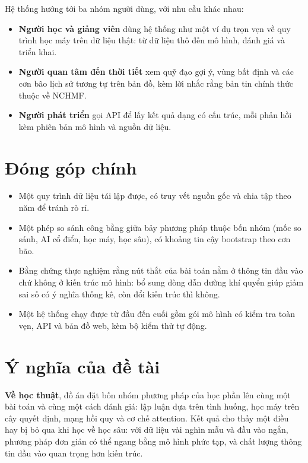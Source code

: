 Hệ thống hướng tới ba nhóm người dùng, với nhu cầu khác nhau:
\begin{itemize}[leftmargin=1.6em, itemsep=2pt]
  \item \textbf{Người học và giảng viên} dùng hệ thống như một ví dụ trọn vẹn
        về quy trình học máy trên dữ liệu thật: từ dữ liệu thô đến mô hình,
        đánh giá và triển khai.
  \item \textbf{Người quan tâm đến thời tiết} xem quỹ đạo gợi ý, vùng bất định
        và các cơn bão lịch sử tương tự trên bản đồ, kèm lời nhắc rằng bản tin
        chính thức thuộc về NCHMF.
  \item \textbf{Người phát triển} gọi API để lấy kết quả dạng có cấu trúc, mỗi
        phản hồi kèm phiên bản mô hình và nguồn dữ liệu.
\end{itemize}

\section{Đóng góp chính}

\begin{itemize}[leftmargin=1.6em, itemsep=2pt]
  \item Một quy trình dữ liệu tái lập được, có truy vết nguồn gốc và chia tập
        theo năm để tránh rò rỉ.
  \item Một phép so sánh công bằng giữa bảy phương pháp thuộc bốn nhóm (mốc
        so sánh, AI cổ điển, học máy, học sâu), có khoảng tin cậy bootstrap
        theo cơn bão.
  \item Bằng chứng thực nghiệm rằng nút thắt của bài toán nằm ở thông tin đầu
        vào chứ không ở kiến trúc mô hình: bổ sung dòng dẫn đường khí quyển
        giúp giảm sai số có ý nghĩa thống kê, còn đổi kiến trúc thì không.
  \item Một hệ thống chạy được từ đầu đến cuối gồm gói mô hình có kiểm tra
        toàn vẹn, API và bản đồ web, kèm bộ kiểm thử tự động.
\end{itemize}

\section{Ý nghĩa của đề tài}

\textbf{Về học thuật}, đồ án đặt bốn nhóm phương pháp của học phần lên cùng
một bài toán và cùng một cách đánh giá: lập luận dựa trên tình huống, học máy
trên cây quyết định, mạng hồi quy và cơ chế attention. Kết quả cho thấy một
điều hay bị bỏ qua khi học về học sâu: với dữ liệu vài nghìn mẫu và đầu vào
ngắn, phương pháp đơn giản có thể ngang bằng mô hình phức tạp, và chất lượng
thông tin đầu vào quan trọng hơn kiến trúc.

